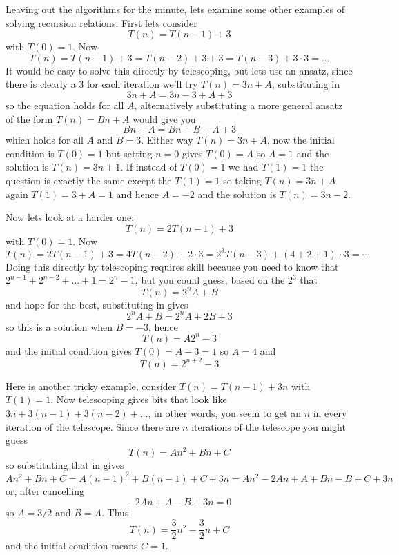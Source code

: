 \documentclass[11pt,a4paper]{scrartcl}
\begin{document}
Leaving out the algorithms for the minute, lets examine some other
examples of solving recursion relations. First lets consider
\begin{equation}
T(n)=T(n-1)+3
\end{equation}
with $T(0)=1$. Now 
\begin{equation}
T(n)=T(n-1)+3=T(n-2)+3+3=T(n-3)+3\cdot 3=\ldots
\end{equation}
It would be easy to solve this directly by telescoping, but lets use
an ansatz, since there is clearly a $3$ for each iteration we'll try
$T(n)=3n+A$, substituting in
$$3n+A=3n-3+A+3$$ so the equation holds for all $A$, alternatively substituting a more general
ansatz of the form $T(n)=Bn+A$ would give you
$$Bn+A=Bn-B+A+3$$ which holds for all $A$ and $B=3$. Either way
$T(n)=3n+A$, now the initial condition is $T(0)=1$ but setting $n=0$
gives $T(0)=A$ so $A=1$ and the solution is $T(n)=3n+1$. If instead of
$T(0)=1$ we had $T(1)=1$ the question is exactly the same except the
$T(1)=1$ so taking $T(n)=3n+A$ again $T(1)=3+A=1$ and hence $A=-2$ and
the solution is $T(n)=3n-2$.

Now lets look at a harder one:
\begin{equation}
T(n)=2T(n-1)+3
\end{equation}
with $T(0)=1$. Now 
\begin{equation}
T(n)=2T(n-1)+3=4T(n-2)+2\cdot 3=2^3T(n-3)+(4+2+1)\cdots 3 =\cdots
\end{equation}
Doing this directly by telescoping requires skill because you need to
know that $2^{n-1}+2^{n-2}+\ldots +1=2^n-1$, but you could guess,
based on the $2^3$ that
\begin{equation}
T(n)=2^nA+B
\end{equation}
and hope for the best, substituting in gives
$$2^nA+B=2^nA+2B+3$$
so this is a solution when $B=-3$, hence
$$T(n)=A2^n-3$$
and the initial condition gives $T(0)=A-3=1$ so $A=4$ and
$$T(n)=2^{n+2}-3$$

Here is another tricky example, consider $T(n)=T(n-1)+3n$ with
$T(1)=1$. Now telescoping gives bits that look like
$3n+3(n-1)+3(n-2)+\ldots$, in other words, you seem to get an $n$ in
every iteration of the telescope. Since there are $n$ iterations of
the telescope you might guess
\begin{equation}
T(n)=An^2+Bn+C
\end{equation}
so substituting that in gives
\begin{equation}
An^2+Bn+C=A(n-1)^2+B(n-1)+C+3n=An^2-2An+A+Bn-B+C+3n
\end{equation}
or, after cancelling
\begin{equation}
-2An+A-B+3n=0
\end{equation}
so $A=3/2$ and $B=A$. Thus
\begin{equation}
T(n)=\frac{3}{2}n^2-\frac{3}{2}n+C
\end{equation}
and the initial condition means $C=1$.
\end{document}
